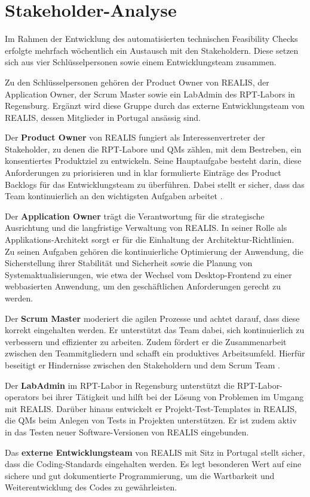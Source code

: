 \section{Stakeholder-Analyse}
Im Rahmen der Entwicklung des automatisierten technischen Feasibility Checks erfolgte mehrfach wöchentlich ein Austausch mit den Stakeholdern. Diese setzen sich aus vier Schlüsselpersonen sowie einem Entwicklungsteam zusammen.

Zu den Schlüsselpersonen gehören der Product Owner von \gls{REALIS}, der Application Owner, der Scrum Master sowie ein LabAdmin des \gls{RPT}-Labors in Regensburg. Ergänzt wird diese Gruppe durch das externe Entwicklungsteam von \gls{REALIS}, dessen Mitglieder in Portugal ansässig sind.

Der \textbf{Product Owner} von \gls{REALIS} fungiert als Interessenvertreter der Stakeholder, zu denen die \gls{RPT}-Labore und \glspl{QM} zählen, mit dem Bestreben, ein konsentiertes Produktziel zu entwickeln. Seine Hauptaufgabe besteht darin, diese Anforderungen zu priorisieren und in klar formulierte Einträge des Product Backlogs für das Entwicklungsteam zu überführen. Dabei stellt er sicher, dass das Team kontinuierlich an den wichtigsten Aufgaben arbeitet \cite{scrumguide2020}.

Der \textbf{Application Owner} trägt die Verantwortung für die strategische Ausrichtung und die langfristige Verwaltung von \gls{REALIS}. In seiner Rolle als Applikations-Architekt sorgt er für die Einhaltung der Architektur-Richtlinien. Zu seinen Aufgaben gehören die kontinuierliche Optimierung der Anwendung, die Sicherstellung ihrer Stabilität und Sicherheit sowie die Planung von Systemaktualisierungen, wie etwa der Wechsel vom Desktop-Frontend zu einer webbasierten Anwendung, um den geschäftlichen Anforderungen gerecht zu werden.

Der \textbf{Scrum Master} moderiert die agilen Prozesse und achtet darauf, dass diese korrekt eingehalten werden. Er unterstützt das Team dabei, sich kontinuierlich zu verbessern und effizienter zu arbeiten. Zudem fördert er die Zusammenarbeit zwischen den Teammitgliedern und schafft ein produktives Arbeitsumfeld. Hierfür beseitigt er Hindernisse zwischen den Stakeholdern und dem Scrum Team \cite{scrumguide2020}.

Der \textbf{LabAdmin} im \gls{RPT}-Labor in Regensburg unterstützt die \gls{RPT}-Labor-\glspl{operator} bei ihrer Tätigkeit und hilft bei der Lösung von Problemen im Umgang mit \gls{REALIS}. Darüber hinaus entwickelt er Projekt-Test-Templates in \gls{REALIS}, die \glspl{QM} beim Anlegen von Tests in Projekten unterstützen. Er ist zudem aktiv in das Testen neuer Software-Versionen von \gls{REALIS} eingebunden.


Das \textbf{externe Entwicklungsteam} von \gls{REALIS} mit Sitz in Portugal stellt sicher, dass die Coding-Standards eingehalten werden. Es legt besonderen Wert auf eine sichere und gut dokumentierte Programmierung, um die Wartbarkeit und Weiterentwicklung des Codes zu gewährleisten.
